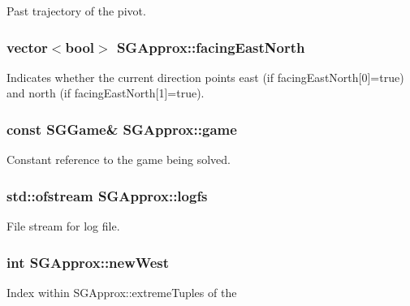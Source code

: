 Past trajectory of the pivot. \hypertarget{classSGApprox_a44ce2e0eba77e1c7c155f38662cba9d0}{
\subsubsection[{facing\-East\-North}]{\setlength{\rightskip}{0pt plus 5cm}vector$<$bool$>$ S\-G\-Approx\-::facing\-East\-North\hspace{0.3cm}{\ttfamily [private]}}}\label{classSGApprox_a44ce2e0eba77e1c7c155f38662cba9d0}
Indicates whether the current direction points east (if facing\-East\-North\mbox{[}0\mbox{]}=true) and north (if facing\-East\-North\mbox{[}1\mbox{]}=true). \hypertarget{classSGApprox_a0774e3ed0ff009809606a42c9e7ef727}{
\subsubsection[{game}]{\setlength{\rightskip}{0pt plus 5cm}const {\bf S\-G\-Game}\& S\-G\-Approx\-::game\hspace{0.3cm}{\ttfamily [private]}}}\label{classSGApprox_a0774e3ed0ff009809606a42c9e7ef727}
Constant reference to the game being solved. \hypertarget{classSGApprox_aa95ff6bda46617fbaa7cf1c8d6708748}{
\subsubsection[{logfs}]{\setlength{\rightskip}{0pt plus 5cm}std\-::ofstream S\-G\-Approx\-::logfs\hspace{0.3cm}{\ttfamily [private]}}}\label{classSGApprox_aa95ff6bda46617fbaa7cf1c8d6708748}
File stream for log file. \hypertarget{classSGApprox_aed002d6e06e7199e10b3ac4f27b6cb6c}{
\subsubsection[{new\-West}]{\setlength{\rightskip}{0pt plus 5cm}int S\-G\-Approx\-::new\-West\hspace{0.3cm}{\ttfamily [private]}}}\label{classSGApprox_aed002d6e06e7199e10b3ac4f27b6cb6c}
\begin{DoxyVerb}       Index within SGApprox::extremeTuples of the
\end{DoxyVerb}
